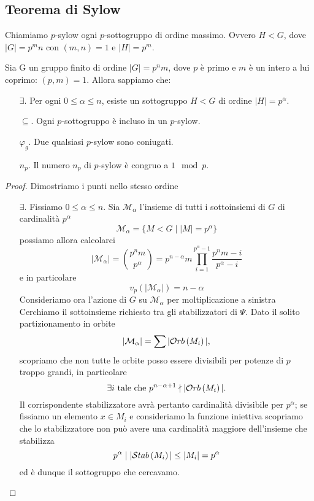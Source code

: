 \subsection{Teorema di Sylow}
\begin{multicols}{2}
	\begin{definition}
		Chiamiamo $ p $-sylow ogni $ p $-sottogruppo di ordine massimo. Ovvero $ H < G $, dove $ |G| = p^mn $ con $ (m, n) = 1 $ e $ |H| = p^m $.
	\end{definition}
\begin{theorem}[di Sylow]\label{sylow}
	Sia G un gruppo finito di ordine $ |G| = p^nm  $, dove $ p $ è primo e $ m $ è un intero a lui coprimo: $ (p, m) = 1 $. Allora sappiamo che:
	\begin{itemize}
		\item[$ \exists $.] Per ogni $ 0 \leq \alpha \leq n $, esiste un sottogruppo $ H<G $ di ordine $|H| = p^\alpha $.
		\item[$ \subseteq $.] Ogni $ p $-sottogruppo è incluso in un $ p $-sylow.
		\item[$ \varphi_g $.] Due qualsiasi $ p $-sylow sono coniugati.
		\item[$ n_p $.] Il numero $ n_p $ di $ p $-sylow è congruo a $ 1 \mod{p}$.
	\end{itemize}
\end{theorem}
\begin{proof}
		Dimostriamo i punti nello stesso ordine
	\begin{itemize}

		\item[$ \exists $.] Fissiamo $ 0 \leq \alpha \leq n $. Sia $ \mathcal{M}_\alpha $ l'insieme di tutti i sottoinsiemi di $ G $ di cardinalità $ p^\alpha $ \[ \mathcal{M}_\alpha = \{ M < G \mid |M| = p^\alpha \} \] possiamo allora calcolarci
		\[ |\mathcal{M}_\alpha| = {p^nm \choose p^\alpha} = p^{n-\alpha}m \prod_{i = 1}^{p^\alpha - 1}\frac{p^nm-i}{p^\alpha -i} \]
		e in particolare
		\[  v_p\left(\left|\mathcal{M}_\alpha\right|\right) = n - \alpha \]
		Consideriamo ora l'azione di $ G $ su $ \mathcal{M}_\alpha $ per moltiplicazione a sinistra
		Cerchiamo il sottoinsieme richiesto tra gli stabilizzatori di $ \Psi $. Dato il solito partizionamento in orbite
		\[ |\mathcal{M}_\alpha| = \sum |\mathcal{O}rb\left( M_i \right)|, \]
		scopriamo che non tutte le orbite posso essere divisibili per potenze di $ p $ troppo grandi, in particolare
		\[ \exists i \text{ tale che }  p^{n-\alpha +1}\nmid |\mathcal{O}rb\left( M_i \right)|. \]
		 Il corrispondente stabilizzatore avrà pertanto cardinalità divisibile per $ p^\alpha $;
		 se fissiamo un elemento $ x \in M_i $ e consideriamo la funzione iniettiva
		 scopriamo che lo stabilizzatore non può avere una cardinalità maggiore dell'insieme che stabilizza
		 \[ p^\alpha \mid |\mathcal{S}tab\left( M_i \right)| \leq |M_i| = p^\alpha \]
		 ed è dunque il sottogruppo che cercavamo.
		

\end{itemize}
\end{proof}
\end{multicols}
